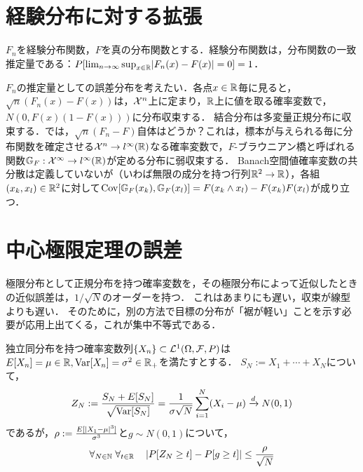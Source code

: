 \documentclass[uplatex,dvipdfmx]{jsreport}
\begin{document}
\section{経験分布に対する拡張}

\begin{theorem}
    $F_n$を経験分布関数，$F$を真の分布関数とする．経験分布関数は，分布関数の一致推定量である：$P[\lim_{n\to\infty}\sup_{x\in\mathbb{R}}\lvert F_n(x)-F(x)\rvert=0]=1$．
\end{theorem}

\begin{discussion}
    $F_n$の推定量としての誤差分布を考えたい．各点$x\in\mathbb{R}$毎に見ると，$\sqrt{n}(F_n(x)-F(x))$は，$\mathcal{X}^n$上に定まり，$\mathbb{R}$上に値を取る確率変数で，$N(0,F(x)(1-F(x)))$に分布収束する．
    結合分布は多変量正規分布に収束する．では，$\sqrt{n}(F_n-F)$自体はどうか？これは，標本が与えられる毎に分布関数を確定させる$\mathcal{X}^n\to l^\infty(\mathbb{R})$なる確率変数で，$F$-ブラウニアン橋と呼ばれる関数$\mathbb{G}_F:\mathcal{X}^\infty\to l^\infty(\mathbb{R})$が定める分布に弱収束する．
    Banach空間値確率変数の共分散は定義していないが（いわば無限の成分を持つ行列$\mathbb{R}^2\to\mathbb{R}$），各組$(x_k,x_l)\in\mathbb{R}^2$に対して$\mathrm{Cov}[\mathbb{G}_F(x_k),\mathbb{G}_F(x_l)]=F(x_k\land x_l)-F(x_k)F(x_l)$が成り立つ．
\end{discussion}

\section{中心極限定理の誤差}

\begin{tcolorbox}[colframe=ForestGreen, colback=ForestGreen!10!white,breakable,colbacktitle=ForestGreen!40!white,coltitle=black,fonttitle=\bfseries\sffamily,
title=]
    極限分布として正規分布を持つ確率変数を，その極限分布によって近似したときの近似誤差は，$1/\sqrt{N}$のオーダーを持つ．
    これはあまりにも遅い，収束が線型よりも遅い．
    そのために，別の方法で目標の分布が「裾が軽い」ことを示す必要が応用上出てくる，これが集中不等式である．
\end{tcolorbox}

\begin{theorem}\label{thm-Berry-Esseen}
    独立同分布を持つ確率変数列$\{X_n\}\subset\mathcal{L}^1(\Omega,\mathcal{F},P)$は$E[X_n]=\mu\in\mathbb{R},\mathrm{Var}[X_n]=\sigma^2\in\mathbb{R}_+$を満たすとする．
    $S_N:=X_1+\cdots+X_N$について，
    \[Z_N:=\frac{S_N+E[S_N]}{\sqrt{\mathrm{Var}[S_N]}}=\frac{1}{\sigma\sqrt{N}}\sum^N_{i=1}(X_i-\mu)\xrightarrow{d}N(0,1)\]
    であるが，$\rho:=\frac{E[\lvert X_1-\mu\rvert^3]}{\sigma^3}$と$g\sim N(0,1)$について，
    \[\forall_{N\in\mathbb{N}}\;\forall_{t\in\mathbb{R}}\quad\left|P[Z_N\ge t]-P[g\ge t]\right|\le\frac{\rho}{\sqrt{N}}\]
\end{theorem}
\end{document}
